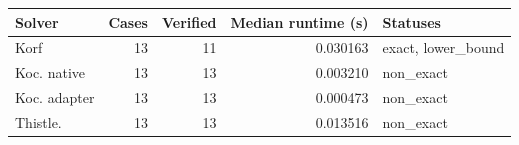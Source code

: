 {\small
\begin{tabular}{L{0.28\textwidth}rrrL{0.16\textwidth}}
\hline
Solver & Cases & Verified & Median runtime (s) & Statuses \\
\hline
Korf & 13 & 11 & 0.030163 & exact, lower\_bound \\
Koc. native & 13 & 13 & 0.003210 & non\_exact \\
Koc. adapter & 13 & 13 & 0.000473 & non\_exact \\
Thistle. & 13 & 13 & 0.013516 & non\_exact \\
\hline
\end{tabular}
}
